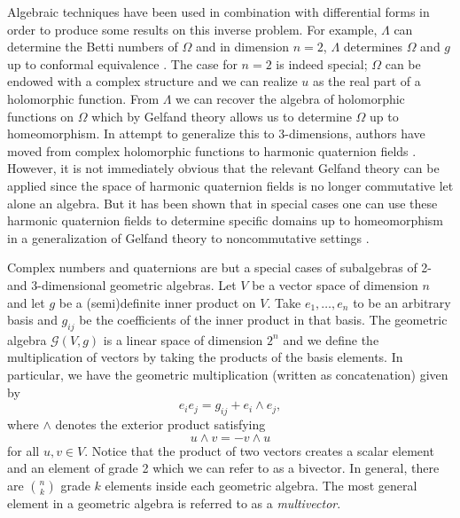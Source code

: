 \documentclass{article}
\begin{document}
Algebraic techniques have been used in combination with differential forms in order to produce some results on this inverse problem. For example, $\Lambda$ can determine the Betti numbers of $\Omega$ \cite{belishev_dirichlet_2008} and in dimension $n=2$, $\Lambda$ determines $\Omega$ and $g$ up to conformal equivalence \cite{belishev_calderon_2003}. The case for $n=2$ is indeed special; $\Omega$ can be endowed with a complex structure and we can realize $u$ as the real part of a holomorphic function. From $\Lambda$ we can recover the algebra of holomorphic functions on $\Omega$ which by Gelfand theory allows us to determine $\Omega$ up to homeomorphism. In attempt to generalize this to 3-dimensions, authors have moved from complex holomorphic functions to harmonic quaternion fields \cite{belishev_algebras_2017}. However, it is not immediately obvious that the relevant Gelfand theory can be applied since the space of harmonic quaternion fields is no longer commutative let alone an algebra. But it has been shown that in special cases one can use these harmonic quaternion fields to determine specific domains up to homeomorphism in a generalization of Gelfand theory to noncommutative settings \cite{belishev_algebras_2019}.

Complex numbers and quaternions are but a special cases of subalgebras of 2- and 3-dimensional geometric algebras. Let $V$ be a vector space of dimension $n$ and let $g$ be a (semi)definite inner product on $V$. Take $e_1,\dots,e_n$ to be an arbitrary basis and $g_{ij}$ be the coefficients of the inner product in that basis. The geometric algebra $\mathcal{G}(V,g)$ is a linear space of dimension $2^n$ and we define the multiplication of vectors by taking the products of the basis elements. In particular, we have the geometric multiplication (written as concatenation) given by
\[
e_i e_j = g_{ij} + e_i \wedge e_j,
\]
where $\wedge$ denotes the exterior product satisfying
\[
u \wedge v = -v\wedge u
\]
for all $u,v \in V$. Notice that the product of two vectors creates a scalar element and an element of grade 2 which we can refer to as a bivector. In general, there are ${n\choose k}$ grade $k$ elements inside each geometric algebra. The most general element in a geometric algebra is referred to as a \emph{multivector}.
\end{document}
